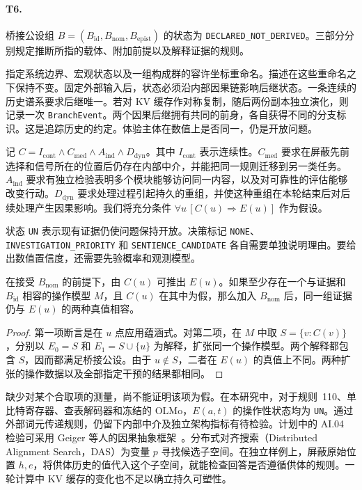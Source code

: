 \paragraph{T6.} 桥接公设组 $B=(B_{\mathrm{id}},B_{\mathrm{nom}},B_{\mathrm{epist}})$ 的状态为 \texttt{DECLARED\_NOT\_DERIVED}。三部分分别规定推断所指的载体、附加前提以及解释证据的规则。
\begin{description}[leftmargin=1.35cm,style=nextline]
\item[$B_{\mathrm{id}}$] 指定系统边界、宏观状态以及一组构成群的容许坐标重命名。描述在这些重命名之下保持不变。固定外部输入后，状态必须沿内部因果链影响后继状态。一条连续的历史谱系要求后继唯一。若对 KV 缓存作对称复制，随后两份副本独立演化，则记录一次 \texttt{BranchEvent}。两个因果后继拥有共同的前身，各自获得不同的分支标识。这是追踪历史的约定。体验主体在数值上是否同一，仍是开放问题。
\item[$B_{\mathrm{nom}}$] 记 $C=I_{\mathrm{cont}}\land C_{\mathrm{med}}\land A_{\mathrm{ind}}\land D_{\mathrm{dyn}}$。其中 $I_{\mathrm{cont}}$ 表示连续性。$C_{\mathrm{med}}$ 要求在屏蔽先前选择和信号所在的位置后仍存在内部中介，并能把同一规则迁移到另一类任务。$A_{\mathrm{ind}}$ 要求有独立检验表明多个模块能够访问同一内容，以及对可靠性的评估能够改变行动。$D_{\mathrm{dyn}}$ 要求处理过程引起持久的重组，并使这种重组在本轮结束后对后续处理产生因果影响。我们将充分条件 $\forall u\,[C(u)\Rightarrow E(u)]$ 作为假设。
\item[$B_{\mathrm{epist}}$] 状态 \texttt{UN} 表示现有证据仍使问题保持开放。决策标记 \texttt{NONE}、\texttt{INVESTIGATION\_PRIORITY} 和 \texttt{SENTIENCE\_CANDIDATE} 各自需要单独说明理由。要给出数值置信度，还需要先验概率和观测模型。
\end{description}
\begin{theorem}[条件定理 T6]
\label{thm:conditional-bridge}
在接受 $B_{\mathrm{nom}}$ 的前提下，由 $C(u)$ 可推出 $E(u)$。如果至少存在一个与证据和 $B_{\mathrm{id}}$ 相容的操作模型 $M$，且 $C(u)$ 在其中为假，那么加入 $B_{\mathrm{nom}}$ 后，同一组证据仍与 $E(u)$ 的两种真值相容。
\end{theorem}
\begin{proof}
第一项断言是在 $u$ 点应用蕴涵式。对第二项，在 $M$ 中取 $S=\{v:C(v)\}$，分别以 $E_0=S$ 和 $E_1=S\cup\{u\}$ 为解释，扩张同一个操作模型。两个解释都包含 $S$，因而都满足桥接公设。由于 $u\notin S$，二者在 $E(u)$ 的真值上不同。两种扩张的操作数据以及全部指定干预的结果都相同。
\end{proof}
缺少对某个合取项的测量，尚不能证明该项为假。在本研究中，对于规则~110、单比特寄存器、查表解码器和冻结的 OLMo，$E(a,t)$ 的操作性状态均为 \texttt{UN}。通过外部词元传递规则，仍留下内部中介及独立架构指标有待检验。计划中的 AI.04 检验可采用 Geiger 等人的因果抽象框架~\cite{geiger2025}。分布式对齐搜索（Distributed Alignment Search，DAS）为变量 $p$ 寻找候选子空间。在独立样例上，屏蔽原始位置 $h,e$，将供体历史的值代入这个子空间，就能检查回答是否遵循供体的规则。一轮计算中 KV 缓存的变化也不足以确立持久可塑性。
